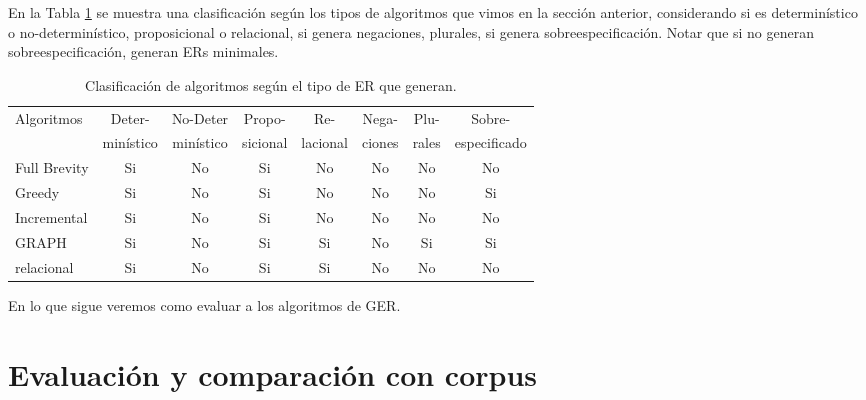 En la Tabla \ref{clasificacion_algoritmos} se muestra una clasificaci\'on seg\'un los tipos de algoritmos que vimos en la secci\'on anterior, 
considerando si es determin\'istico o no-determin\'istico, proposicional o relacional, 
si genera negaciones, plurales, si genera sobreespecificaci\'on. Notar que si no generan sobreespecificaci\'on, generan ERs minimales.
\label{sec:algoritmos_area}

\begin{table}[b]
\begin{center}
\begin{tabular}{|l|c|c|c|c|c|c|c|}
\hline
 Algoritmos& Deter- & No-Deter & Propo- & Re- & Nega- & Plu- & Sobre- \\
 & min\'istico & min\'istico & sicional & lacional & ciones & rales & especificado \\
\hline
Full Brevity &Si & No&Si&No&No&No& No \\
Greedy&Si & No&Si&No&No&No& Si \\
Incremental&Si & No&Si&No&No&No& No \\
GRAPH&Si & No&Si&Si&No&Si& Si \\ 
relacional&Si & No&Si&Si&No&No& No \\
\hline

\end{tabular}
\caption{Clasificaci\'on de algoritmos seg\'un el tipo de ER que generan.} 
\label{clasificacion_algoritmos}
\vspace*{-.5cm}
\end{center}
\end{table}



En lo que sigue veremos como evaluar a los algoritmos de GER.





\section{Evaluaci\'on y comparaci\'on con corpus}

\label{sec:metricas_evaluacion}

